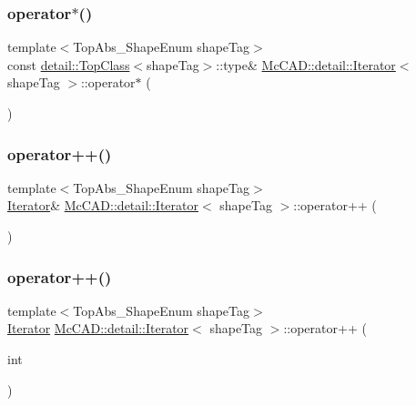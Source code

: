\subsubsection{\texorpdfstring{operator$\ast$()}{operator*()}}
{\footnotesize\ttfamily template$<$Top\+Abs\+\_\+\+Shape\+Enum shape\+Tag$>$ \\
const \hyperlink{structMcCAD_1_1detail_1_1TopClass}{detail\+::\+Top\+Class}$<$shape\+Tag$>$\+::type\& \hyperlink{classMcCAD_1_1detail_1_1Iterator}{Mc\+C\+A\+D\+::detail\+::\+Iterator}$<$ shape\+Tag $>$\+::operator$\ast$ (\begin{DoxyParamCaption}{ }\end{DoxyParamCaption})}

\mbox{\label{classMcCAD_1_1detail_1_1Iterator_ae8af9de0efeb7fa97b6c37686909f0f3}} 
\subsubsection{\texorpdfstring{operator++()}{operator++()}\hspace{0.1cm}{\footnotesize\ttfamily [1/2]}}
{\footnotesize\ttfamily template$<$Top\+Abs\+\_\+\+Shape\+Enum shape\+Tag$>$ \\
\hyperlink{classMcCAD_1_1detail_1_1Iterator}{Iterator}\& \hyperlink{classMcCAD_1_1detail_1_1Iterator}{Mc\+C\+A\+D\+::detail\+::\+Iterator}$<$ shape\+Tag $>$\+::operator++ (\begin{DoxyParamCaption}{ }\end{DoxyParamCaption})}

\mbox{\label{classMcCAD_1_1detail_1_1Iterator_a54d5d98592dcf959c5acaeb30c5f37ac}} 
\subsubsection{\texorpdfstring{operator++()}{operator++()}\hspace{0.1cm}{\footnotesize\ttfamily [2/2]}}
{\footnotesize\ttfamily template$<$Top\+Abs\+\_\+\+Shape\+Enum shape\+Tag$>$ \\
\hyperlink{classMcCAD_1_1detail_1_1Iterator}{Iterator} \hyperlink{classMcCAD_1_1detail_1_1Iterator}{Mc\+C\+A\+D\+::detail\+::\+Iterator}$<$ shape\+Tag $>$\+::operator++ (\begin{DoxyParamCaption}\item[{int}]{ }\end{DoxyParamCaption})}

